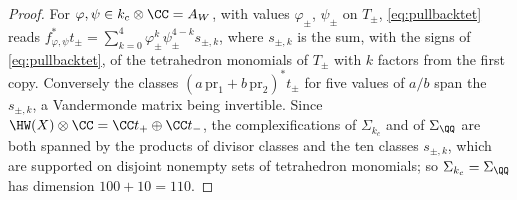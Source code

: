 \begin{proof}
For $\varphi,\psi\in k_{c}\otimes\CC=A_{W}$, with values $\varphi_{\pm}$,
$\psi_{\pm}$ on $T_{\pm}$, \eqref{eq:pullbacktet} reads
$f_{\varphi,\psi}^{*}t_{\pm}=\sum_{k=0}^{4}\varphi_{\pm}^{k}\psi_{\pm}^{4-k}
s_{\pm,k}$, where $s_{\pm,k}$ is the sum, with the signs of
\eqref{eq:pullbacktet}, of the tetrahedron monomials of $T_{\pm}$ with $k$
factors from the first copy. Conversely the classes
$(a\,\mathrm{pr}_{1}+b\,\mathrm{pr}_{2})^{*}t_{\pm}$ for five values of $a/b$
span the $s_{\pm,k}$, a Vandermonde matrix being invertible. Since
$\HW(X)\otimes\CC=\CC t_{+}\oplus\CC t_{-}$, the complexifications of
$\Sigma_{k_{c}}$ and of $\Sigma_{\QQ}$ are both spanned by the products of
divisor classes and the ten classes $s_{\pm,k}$, which are supported on
disjoint nonempty sets of tetrahedron monomials; so
$\Sigma_{k_{c}}=\Sigma_{\QQ}$ has dimension $100+10=110$.


\end{proof}
